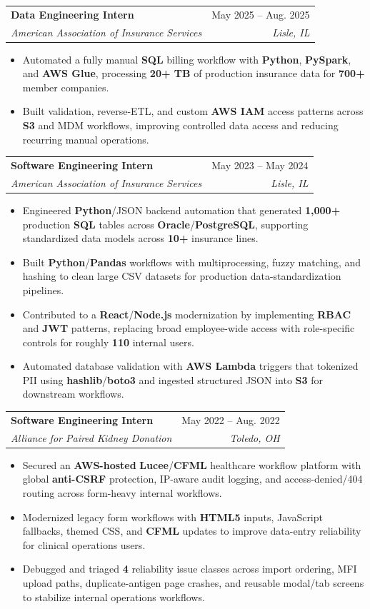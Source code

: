 \documentclass[letterpaper,11pt]{article}
\makeatletter
\newcommand{\resumeItem}[1]{
  \item\small{
    {#1 \vspace{-2pt}}
  }
}
\newcommand{\resumeSubheading}[4]{
  \vspace{-1pt}\item
    \begin{tabular*}{0.97\textwidth}[t]{l@{\extracolsep{\fill}}r}
      \textbf{#1} & #2 \\
      \textit{\small#3} & \textit{\small #4} \\
    \end{tabular*}\vspace{-3pt}
}
\newcommand{\resumeItemListStart}{\begin{itemize}[leftmargin=0.16in, itemsep=0pt, topsep=0pt, parsep=0pt]}
\newcommand{\resumeItemListEnd}{\end{itemize}\vspace{-5pt}}
\makeatother
\begin{document}
    \resumeSubheading
      {Data Engineering Intern}{May 2025 -- Aug. 2025}
      {American Association of Insurance Services}{Lisle, IL}
      \resumeItemListStart
        \resumeItem{Automated a fully manual \textbf{SQL} billing workflow with \textbf{Python}, \textbf{PySpark}, and \textbf{AWS Glue}, processing \textbf{20+ TB} of production insurance data for \textbf{700+} member companies.}
        \resumeItem{Built validation, reverse-ETL, and custom \textbf{AWS IAM} access patterns across \textbf{S3} and MDM workflows, improving controlled data access and reducing recurring manual operations.}
      \resumeItemListEnd

    \resumeSubheading
      {Software Engineering Intern}{May 2023 -- May 2024}
      {American Association of Insurance Services}{Lisle, IL}
      \resumeItemListStart
        \resumeItem{Engineered \textbf{Python}/JSON backend automation that generated \textbf{1,000+} production \textbf{SQL} tables across \textbf{Oracle}/\textbf{PostgreSQL}, supporting standardized data models across \textbf{10+} insurance lines.}
        \resumeItem{Built \textbf{Python}/\textbf{Pandas} workflows with multiprocessing, fuzzy matching, and hashing to clean large CSV datasets for production data-standardization pipelines.}
        \resumeItem{Contributed to a \textbf{React}/\textbf{Node.js} modernization by implementing \textbf{RBAC} and \textbf{JWT} patterns, replacing broad employee-wide access with role-specific controls for roughly \textbf{110} internal users.}
        \resumeItem{Automated database validation with \textbf{AWS Lambda} triggers that tokenized PII using \textbf{hashlib}/\textbf{boto3} and ingested structured JSON into \textbf{S3} for downstream workflows.}
      \resumeItemListEnd

    \resumeSubheading
      {Software Engineering Intern}{May 2022 -- Aug. 2022}
      {Alliance for Paired Kidney Donation}{Toledo, OH}
      \resumeItemListStart
        \resumeItem{Secured an \textbf{AWS-hosted} \textbf{Lucee}/\textbf{CFML} healthcare workflow platform with global \textbf{anti-CSRF} protection, IP-aware audit logging, and access-denied/404 routing across form-heavy internal workflows.}
        \resumeItem{Modernized legacy form workflows with \textbf{HTML5} inputs, JavaScript fallbacks, themed CSS, and \textbf{CFML} updates to improve data-entry reliability for clinical operations users.}
        \resumeItem{Debugged and triaged \textbf{4} reliability issue classes across import ordering, MFI upload paths, duplicate-antigen page crashes, and reusable modal/tab screens to stabilize internal operations workflows.}
      \resumeItemListEnd
\end{document}
